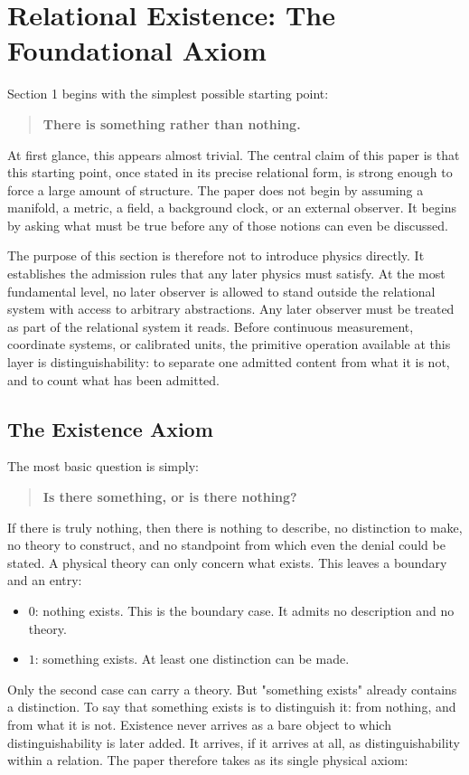 \section{Relational Existence: The Foundational Axiom}
\label{sec:01}
Section 1 begins with the simplest possible starting point:

\begin{quote}
\textbf{There is something rather than nothing.}
\end{quote}
At first glance, this appears almost trivial. The central claim of this paper is that this starting point, once stated in its precise relational form, is strong enough to force a large amount of structure. The paper does not begin by assuming a manifold, a metric, a field, a background clock, or an external observer. It begins by asking what must be true before any of those notions can even be discussed.

The purpose of this section is therefore not to introduce physics directly. It establishes the admission rules that any later physics must satisfy. At the most fundamental level, no later observer is allowed to stand outside the relational system with access to arbitrary abstractions. Any later observer must be treated as part of the relational system it reads. Before continuous measurement, coordinate systems, or calibrated units, the primitive operation available at this layer is distinguishability: to separate one admitted content from what it is not, and to count what has been admitted.

\subsection{The Existence Axiom}
The most basic question is simply:

\begin{quote}
\textbf{Is there something, or is there nothing?}
\end{quote}
If there is truly nothing, then there is nothing to describe, no distinction to make, no theory to construct, and no standpoint from which even the denial could be stated. A physical theory can only concern what exists. This leaves a boundary and an entry:

\begin{itemize}
\item \(0\): nothing exists. This is the boundary case. It admits no description and no theory.
\item \(1\): something exists. At least one distinction can be made.
\end{itemize}
Only the second case can carry a theory. But "something exists" already contains a distinction. To say that something exists is to distinguish it: from nothing, and from what it is not. Existence never arrives as a bare object to which distinguishability is later added. It arrives, if it arrives at all, as distinguishability within a relation. The paper therefore takes as its single physical axiom:

